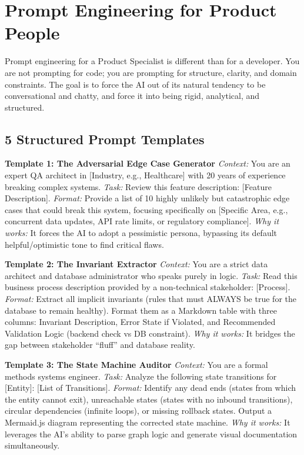 \section{Prompt Engineering for Product
People}\label{prompt-engineering-for-product-people}

Prompt engineering for a Product Specialist is different than for a
developer. You are not prompting for code; you are prompting for
structure, clarity, and domain constraints. The goal is to force the AI
out of its natural tendency to be conversational and chatty, and force
it into being rigid, analytical, and structured.

\subsection{5 Structured Prompt
Templates}\label{structured-prompt-templates}

\textbf{Template 1: The Adversarial Edge Case Generator} \emph{Context:}
You are an expert QA architect in {[}Industry, e.g., Healthcare{]} with
20 years of experience breaking complex systems. \emph{Task:} Review
this feature description: {[}Feature Description{]}. \emph{Format:}
Provide a list of 10 highly unlikely but catastrophic edge cases that
could break this system, focusing specifically on {[}Specific Area,
e.g., concurrent data updates, API rate limits, or regulatory
compliance{]}. \emph{Why it works:} It forces the AI to adopt a
pessimistic persona, bypassing its default helpful/optimistic tone to
find critical flaws.

\textbf{Template 2: The Invariant Extractor} \emph{Context:} You are a
strict data architect and database administrator who speaks purely in
logic. \emph{Task:} Read this business process description provided by a
non-technical stakeholder: {[}Process{]}. \emph{Format:} Extract all
implicit invariants (rules that must ALWAYS be true for the database to
remain healthy). Format them as a Markdown table with three columns:
Invariant Description, Error State if Violated, and Recommended
Validation Logic (backend check vs DB constraint). \emph{Why it works:}
It bridges the gap between stakeholder ``fluff'' and database reality.

\textbf{Template 3: The State Machine Auditor} \emph{Context:} You are a
formal methods systems engineer. \emph{Task:} Analyze the following
state transitions for {[}Entity{]}: {[}List of Transitions{]}.
\emph{Format:} Identify any dead ends (states from which the entity
cannot exit), unreachable states (states with no inbound transitions),
circular dependencies (infinite loops), or missing rollback states.
Output a Mermaid.js diagram representing the corrected state machine.
\emph{Why it works:} It leverages the AI's ability to parse graph logic
and generate visual documentation simultaneously.

